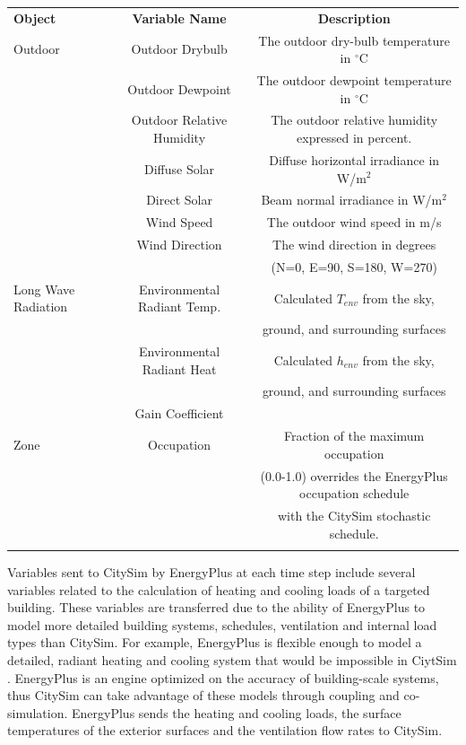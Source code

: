 \documentclass{tBPS2e}
\theoremstyle{plain}
\theoremstyle{definition}
\theoremstyle{remark}
\begin{document}
\begin{table}[H]
{\begin{tabular}[l]{@{}lcc}\toprule
  \bf{Object} &  \bf{Variable Name} & \bf{Description} \\
\colrule
  Outdoor & Outdoor Drybulb & The outdoor dry-bulb temperature in $^{\circ}\mathrm{C}$ \\
 & Outdoor Dewpoint & The outdoor dewpoint temperature in $^{\circ}\mathrm{C}$ \\
 & Outdoor Relative Humidity & The outdoor relative humidity expressed in percent. \\
 & Diffuse Solar & Diffuse horizontal irradiance in W/m$^2$ \\
 & Direct Solar & Beam normal irradiance in W/m$^2$ \\
 & Wind Speed & The outdoor wind speed in m/s \\
 & Wind Direction & The wind direction in degrees\\&&  (N=0, E=90, S=180, W=270) \\
 \hline
 Long Wave Radiation & Environmental Radiant Temp. & Calculated $T_{env}$ from the sky,\\&& ground, and surrounding surfaces \\
 & Environmental Radiant Heat & Calculated $h_{env}$ from the sky,\\&& ground, and surrounding surfaces \\
 & Gain Coefficient \\
 \hline
Zone & Occupation & Fraction of the maximum occupation\\&& (0.0-1.0) overrides the EnergyPlus occupation schedule\\&&  with the CitySim stochastic schedule. \\
\botrule
\end{tabular}}
\label{FMUimports}
\end{table}

Variables sent to CitySim by EnergyPlus at each time step include several variables related to the calculation of heating and cooling loads of a targeted building. These variables are transferred due to the ability of EnergyPlus to model more detailed building systems, schedules, ventilation and internal load types than CitySim. For example, EnergyPlus is flexible enough to model a detailed, radiant heating and cooling system that would be impossible in CiytSim \cite{barbara:2015tz}. EnergyPlus is an engine optimized on the accuracy of building-scale systems, thus CitySim can take advantage of these models through coupling and co-simulation. EnergyPlus sends the heating and cooling loads, the surface temperatures of the exterior surfaces and the ventilation flow rates to CitySim.
\end{document}
